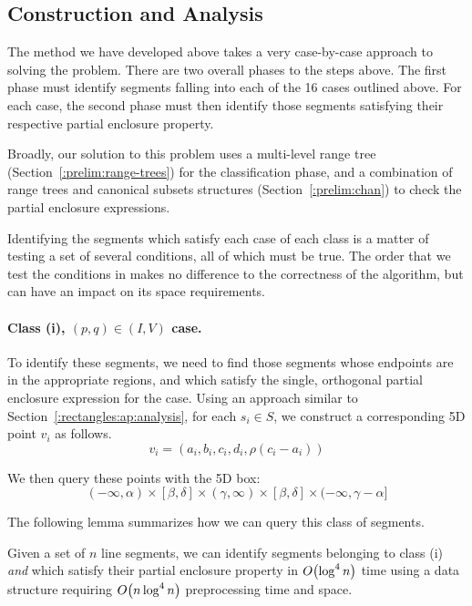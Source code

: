 \subsection{Construction and Analysis}
\label{:rectangles:ao:analysis}

The method we have developed above takes a very case-by-case approach to solving the problem. 
There are two overall phases to the steps above. 
The first phase must identify segments falling into each of the 16 cases outlined above. 
For each case, the second phase must then identify those segments satisfying their respective partial enclosure property. 

Broadly, our solution to this problem uses a multi-level range tree (Section~\ref{:prelim:range-trees}) for the classification phase, and a combination of range trees and canonical subsets structures (Section~\ref{:prelim:chan}) to check the partial enclosure expressions. 

Identifying the segments which satisfy each case of each class is a matter of testing a set of several conditions, all of which must be true. The order that we test the conditions in makes no difference to the correctness of the algorithm, but can have an impact on its space requirements.

\paragraph{Class (i), $(p, q) \in (I, V)$ case.} 
To identify these segments, we need to find those segments whose endpoints are in the appropriate regions, and which satisfy the single, orthogonal partial enclosure expression for the case. 
Using an approach similar to Section~\ref{:rectangles:ap:analysis}, for each $s_i \in S$, we construct a corresponding 5D point $v_i$ as follows.
\[
v_i = (a_i, b_i, c_i, d_i, \rho(c_i - a_i))
\]

\noindent We then query these points with the 5D box:
\[
(-\infty, \alpha) \times [\beta, \delta] \times (\gamma, \infty) \times [\beta, \delta] \times (-\infty, \gamma - \alpha]
\]

\noindent The following lemma summarizes how we can query this class of segments.

\begin{lemma}
\label{lem:ao:class1:v}
Given a set of $n$ line segments, we can identify segments belonging to class (i) \emph{and} which satisfy their partial enclosure property in $O\!\left(\log^4{n}\right)$ time using a data structure requiring $O\!\left(n\log^4{n}\right)$ preprocessing time and space.
\end{lemma}


